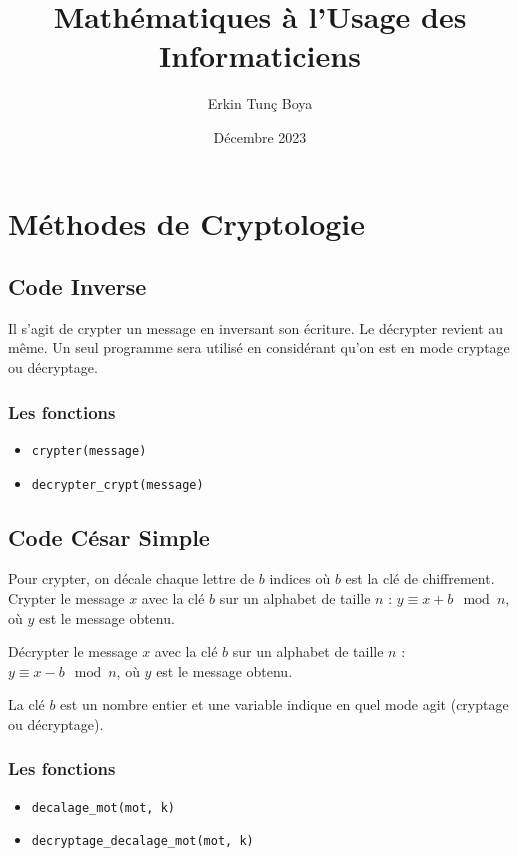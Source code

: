 \documentclass{article}
\title{Mathématiques à l'Usage des Informaticiens}
\author{Erkin Tunç Boya}
\date{Décembre 2023}
\begin{document}
\maketitle
\tableofcontents
\newpage

\section{Méthodes de Cryptologie}

\subsection{Code Inverse}
Il s'agit de crypter un message en inversant son écriture. Le décrypter revient au même. Un seul programme sera utilisé en considérant qu'on est en mode cryptage ou décryptage.

\subsubsection{Les fonctions}
\begin{itemize}
    \item \texttt{crypter(message)}
    \item \texttt{decrypter\_crypt(message)}
\end{itemize}

\subsection{Code César Simple}
Pour crypter, on décale chaque lettre de \(b\) indices où \(b\) est la clé de chiffrement. Crypter le message \(x\) avec la clé \(b\) sur un alphabet de taille \(n\) : \(y \equiv x + b \mod n\), où \(y\) est le message obtenu.

Décrypter le message \(x\) avec la clé \(b\) sur un alphabet de taille \(n\) : \(y \equiv x - b \mod n\), où \(y\) est le message obtenu.

La clé \(b\) est un nombre entier et une variable indique en quel mode agit (cryptage ou décryptage).

\subsubsection{Les fonctions}
\begin{itemize}
    \item \texttt{decalage\_mot(mot, k)}
    \item \texttt{decryptage\_decalage\_mot(mot, k)}
\end{itemize}
\end{document}
